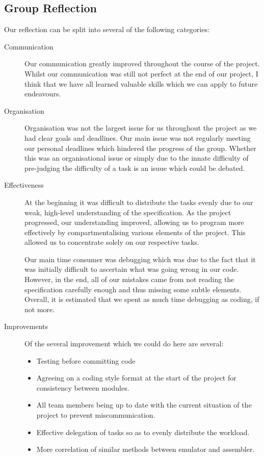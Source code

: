 \documentclass[11pt]{article}
\begin{document}
\subsection{Group Reflection}
Our reflection can be split into several of the following categories:
\begin{description}
\item[Communication]
Our communication greatly improved throughout the course of the project. Whilst our communication was still not perfect at the end of our project, I think that we have all learned valuable skills which we can apply to future endeavours.

\item[Organisation]
Organisation was not the largest issue for us throughout the project as we had clear goals and deadlines. Our main issue was not regularly meeting our personal deadlines which hindered the progress of the group. Whether this was an organisational issue or simply due to the innate difficulty of pre-judging the difficulty of a task is an isuue which could be debated.

\item[Effectiveness]
At the beginning it was difficult to distribute the tasks evenly due to our weak, high-level understanding of the specification. As the project progressed, our understanding improved, allowing us to program more effectively by compartmentalising various elements of the project. This allowed us to concentrate solely on our respective tasks.

Our main time consumer was debugging which was due to the fact that it was initially difficult to ascertain what was going wrong in our code. However, in the end, all of our mistakes came from not reading the specification carefully enough and thus missing some subtle elements. Overall, it is estimated that we spent as much time debugging as coding, if not more.

\item[Improvements]
Of the several improvement which we could do here are several:
	\begin{itemize}
		\item 
		Testing before committing code
		\item 
		Agreeing on a coding style format at the start of the project  for consistency between modules. 
		\item
		All team members being up to date with the current situation of the project to prevent miscommunication.
		\item
		Effective delegation of tasks so as to evenly distribute the workload.
		\item
		More correlation of similar methods between emulator and assembler.
		 

	\end{itemize}
\end{description}
\end{document}
